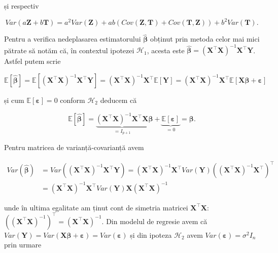 \documentclass[]{article}
\begin{document}
și respectiv

\[
  Var(a\boldsymbol Z + b\boldsymbol T) = a^2 Var(\boldsymbol Z) + ab\left(Cov(\boldsymbol Z, \boldsymbol T) + Cov(\boldsymbol T, \boldsymbol Z)\right) + b^2 Var(\boldsymbol T).
\]

Pentru a verifica nedeplasarea estimatorului \(\hat{\boldsymbol \beta}\)
obținut prin metoda celor mai mici pătrate să notăm că, în contextul
ipotezei \(\mathcal{H}_1\), acesta este
\(\hat{\boldsymbol \beta} = (\boldsymbol X^\intercal \boldsymbol X)^{-1} \boldsymbol X^\intercal \boldsymbol Y\).
Astfel putem scrie

\[
  \mathbb{E}[\hat{\boldsymbol \beta}] = \mathbb{E}\left[(\boldsymbol X^\intercal \boldsymbol X)^{-1} \boldsymbol X^\intercal \boldsymbol Y\right] = (\boldsymbol X^\intercal \boldsymbol X)^{-1} \boldsymbol X^\intercal \mathbb{E}[\boldsymbol Y] = (\boldsymbol X^\intercal \boldsymbol X)^{-1} \boldsymbol X^\intercal \mathbb{E}[\boldsymbol X\boldsymbol \beta + \boldsymbol \varepsilon]
\]

și cum \(\mathbb{E}[\boldsymbol \varepsilon] = 0\) conform
\(\mathcal{H}_2\) deducem că

\[
  \mathbb{E}[\hat{\boldsymbol \beta}] = \underbrace{(\boldsymbol X^\intercal \boldsymbol X)^{-1} \boldsymbol X^\intercal \boldsymbol X}_{ = I_{p+1}}\boldsymbol \beta + \underbrace{\mathbb{E}[\boldsymbol \varepsilon]}_{=0} = \boldsymbol \beta.
\]

Pentru matricea de varianță-covarianță avem

\begin{align*}
  Var(\hat{\boldsymbol \beta}) &= Var\left((\boldsymbol X^\intercal \boldsymbol X)^{-1} \boldsymbol X^\intercal \boldsymbol Y\right) = (\boldsymbol X^\intercal \boldsymbol X)^{-1} \boldsymbol X^\intercal Var\left(\boldsymbol Y\right) \left((\boldsymbol X^\intercal \boldsymbol X)^{-1} \boldsymbol X^\intercal\right)^\intercal \\
  &= (\boldsymbol X^\intercal \boldsymbol X)^{-1} \boldsymbol X^\intercal Var\left(\boldsymbol Y\right) \boldsymbol X (\boldsymbol X^\intercal \boldsymbol X)^{-1}
\end{align*}

unde în ultima egalitate am ținut cont de simetria matricei
\(\boldsymbol X^\intercal \boldsymbol X\):
\(\left((\boldsymbol X^\intercal \boldsymbol X)^{-1}\right)^\intercal = (\boldsymbol X^\intercal \boldsymbol X)^{-1}\).
Din modelul de regresie avem că
\(Var\left(\boldsymbol Y\right) = Var\left(\boldsymbol X\boldsymbol \beta + \boldsymbol\varepsilon\right) = Var(\boldsymbol\varepsilon)\)
și din ipoteza \(\mathcal{H}_2\) avem
\(Var(\boldsymbol\varepsilon) = \sigma^2 I_n\) prin urmare
\end{document}
